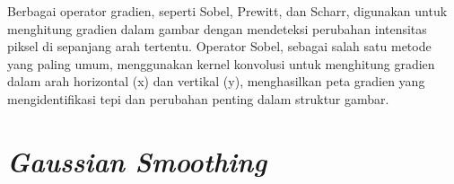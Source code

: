   Berbagai operator gradien, seperti Sobel, Prewitt, dan Scharr, digunakan untuk menghitung gradien dalam gambar dengan mendeteksi perubahan intensitas piksel di sepanjang arah tertentu. 
Operator Sobel, sebagai salah satu metode yang paling umum, menggunakan kernel konvolusi untuk menghitung gradien dalam arah horizontal (x) dan vertikal (y), menghasilkan peta gradien yang mengidentifikasi tepi dan perubahan penting dalam struktur gambar.

\section{\emph{Gaussian Smoothing}}


